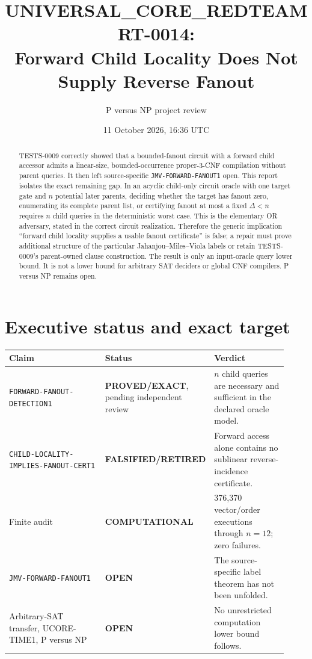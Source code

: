 \documentclass[11pt]{article}
\title{UNIVERSAL\_CORE\_REDTEAM RT-0014:\\
Forward Child Locality Does Not Supply Reverse Fanout}
\author{P versus NP project review}
\date{11 October 2026, 16:36 UTC}
\newcommand{\EXACT}{\textbf{PROVED/EXACT}}
\newcommand{\OPEN}{\textbf{OPEN}}
\newcommand{\RETIRED}{\textbf{FALSIFIED/RETIRED}}
\newcommand{\COMP}{\textbf{COMPUTATIONAL}}
\begin{document}
\maketitle

\begin{abstract}
TESTS-0009 correctly showed that a bounded-fanout circuit with a forward
child accessor admits a linear-size, bounded-occurrence proper-3-CNF
compilation without parent queries.  It then left source-specific
\texttt{JMV-FORWARD-FANOUT1} open.  This report isolates the exact remaining
gap.  In an acyclic child-only circuit oracle with one target gate and $n$
potential later parents, deciding whether the target has fanout zero,
enumerating its complete parent list, or certifying fanout at most a fixed
$\Delta<n$ requires $n$ child queries in the deterministic worst case.
This is the elementary OR adversary, stated in the correct circuit
realization.  Therefore the generic implication ``forward child locality
supplies a usable fanout certificate'' is false; a repair must prove
additional structure of the particular Jahanjou--Miles--Viola labels or
retain TESTS-0009's parent-owned clause construction.  The result is only an
input-oracle query lower bound.  It is not a lower bound for arbitrary SAT
deciders or global CNF compilers.  P versus NP remains open.
\end{abstract}

\section{Executive status and exact target}

\begin{center}
\small
\begin{tabular}{@{}p{0.43\linewidth}p{0.19\linewidth}p{0.30\linewidth}@{}}
\toprule
Claim & Status & Verdict\\
\midrule
\texttt{FORWARD-FANOUT-DETECTION1} & \EXACT, pending independent review &
$n$ child queries are necessary and sufficient in the declared oracle model.\\
\texttt{CHILD-LOCALITY-IMPLIES-FANOUT-CERT1} & \RETIRED &
Forward access alone contains no sublinear reverse-incidence certificate.\\
Finite audit & \COMP & 376,370 vector/order executions through $n=12$; zero failures.\\
\texttt{JMV-FORWARD-FANOUT1} & \OPEN &
The source-specific label theorem has not been unfolded.\\
Arbitrary-SAT transfer, UCORE-TIME1, P versus NP & \OPEN &
No unrestricted computation lower bound follows.\\
\bottomrule
\end{tabular}
\end{center}
\end{document}

